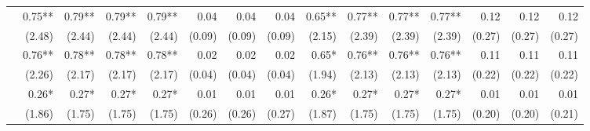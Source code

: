 \begin{tabularx}{1.45\textwidth}{lRRRRRRRRRRRRRR}
		 & \num{0.75}**\phantom{*)} & \num{0.79}**\phantom{*)} & \num{0.79}**\phantom{*)} & \num{0.79}**\phantom{*)} & \num{0.04}\phantom{***)} & \num{0.04}\phantom{***)} & \num{0.04}\phantom{***)} & \num{0.65}**\phantom{*)} & \num{0.77}**\phantom{*)} & \num{0.77}**\phantom{*)} & \num{0.77}**\phantom{*)} & \num{0.12}\phantom{***)} & \num{0.12}\phantom{***)} & \num{0.12}\phantom{***)} \\
		 & (\num{2.48})\phantom{***} & (\num{2.44})\phantom{***} & (\num{2.44})\phantom{***} & (\num{2.44})\phantom{***} & (\num{0.09})\phantom{***} & (\num{0.09})\phantom{***} & (\num{0.09})\phantom{***} & (\num{2.15})\phantom{***} & (\num{2.39})\phantom{***} & (\num{2.39})\phantom{***} & (\num{2.39})\phantom{***} & (\num{0.27})\phantom{***} & (\num{0.27})\phantom{***} & (\num{0.27})\phantom{***} \\ [\dspacing]
		 & \num{0.76}**\phantom{*)} & \num{0.78}**\phantom{*)} & \num{0.78}**\phantom{*)} & \num{0.78}**\phantom{*)} & \num{0.02}\phantom{***)} & \num{0.02}\phantom{***)} & \num{0.02}\phantom{***)} & \num{0.65}*\phantom{**)} & \num{0.76}**\phantom{*)} & \num{0.76}**\phantom{*)} & \num{0.76}**\phantom{*)} & \num{0.11}\phantom{***)} & \num{0.11}\phantom{***)} & \num{0.11}\phantom{***)} \\
		 & (\num{2.26})\phantom{***} & (\num{2.17})\phantom{***} & (\num{2.17})\phantom{***} & (\num{2.17})\phantom{***} & (\num{0.04})\phantom{***} & (\num{0.04})\phantom{***} & (\num{0.04})\phantom{***} & (\num{1.94})\phantom{***} & (\num{2.13})\phantom{***} & (\num{2.13})\phantom{***} & (\num{2.13})\phantom{***} & (\num{0.22})\phantom{***} & (\num{0.22})\phantom{***} & (\num{0.22})\phantom{***} \\ [\dspacing]
		 & \num{0.26}*\phantom{**)} & \num{0.27}*\phantom{**)} & \num{0.27}*\phantom{**)} & \num{0.27}*\phantom{**)} & \num{0.01}\phantom{***)} & \num{0.01}\phantom{***)} & \num{0.01}\phantom{***)} & \num{0.26}*\phantom{**)} & \num{0.27}*\phantom{**)} & \num{0.27}*\phantom{**)} & \num{0.27}*\phantom{**)} & \num{0.01}\phantom{***)} & \num{0.01}\phantom{***)} & \num{0.01}\phantom{***)} \\
		 & (\num{1.86})\phantom{***} & (\num{1.75})\phantom{***} & (\num{1.75})\phantom{***} & (\num{1.75})\phantom{***} & (\num{0.26})\phantom{***} & (\num{0.26})\phantom{***} & (\num{0.27})\phantom{***} & (\num{1.87})\phantom{***} & (\num{1.75})\phantom{***} & (\num{1.75})\phantom{***} & (\num{1.75})\phantom{***} & (\num{0.20})\phantom{***} & (\num{0.20})\phantom{***} & (\num{0.21})\phantom{***} \\ [\dspacing]


\end{tabularx}
